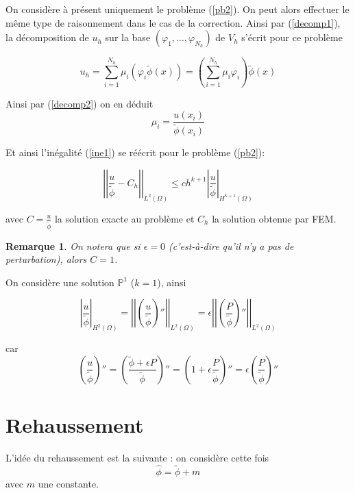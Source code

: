 \documentclass[french]{article}
\newtheorem*{Rem}{Remarque}
\begin{document}
	On considère à présent uniquement le problème (\ref{pb2}). On peut alors effectuer le même type de raisonnement dans le cas de la correction. Ainsi par (\ref{decomp1}), la décomposition de $u_h$ sur la base $(\varphi_1,\dots,\varphi_{N_h})$ de $V_h$ s'écrit pour ce problème
	
	\begin{equation}
		u_h=\sum_{i=1}^{N_h}\mu_i(\varphi_i\tilde{\phi}(x))=\left(\sum_{i=1}^{N_h}\mu_i\varphi_i\right)\tilde{\phi}(x) \label{decomp2}
	\end{equation}
		
	Ainsi par (\ref{decomp2}) on en déduit
	$$\mu_i=\frac{u(x_i)}{\tilde{\phi}(x_i)}$$

	Et ainsi l'inégalité (\ref{ine1}) se réécrit pour le problème (\ref{pb2}):
	
	\begin{equation}
		\left|\left|\frac{u}{\tilde{\phi}}-C_h\right|\right|_{L^2(\Omega)}\le ch^{k+1}\left|\frac{u}{\tilde{\phi}}\right|_{H^{k+1}(\Omega)} \label{ine2}
	\end{equation}

	avec $C=\frac{u}{\tilde{\phi}}$ la solution exacte au problème et $C_h$ la solution obtenue par FEM.
	
	\begin{Rem}
		On notera que si $\epsilon=0$ (c'est-à-dire qu'il n'y a pas de perturbation), alors $C=1$.
	\end{Rem}
	
	On considère une solution $\mathbb{P}^1$ ($k=1$), ainsi
	
	\begin{equation}
		\left|\frac{u}{\tilde{\phi}}\right|_{H^2(\Omega)}=\left|\left|\left(\frac{u}{\tilde{\phi}}\right)''\right|\right|_{L^2(\Omega)}=\epsilon\left|\left|\left(\frac{P}{\tilde{\phi}}\right)''\right|\right|_{L^2(\Omega)} \label{der1}
	\end{equation}
	
	car
	$$\left(\frac{u}{\tilde{\phi}}\right)''=\left(\frac{\tilde{\phi}+\epsilon P}{\tilde{\phi}}\right)''=\left(1+\epsilon\frac{P}{\tilde{\phi}}\right)''=\epsilon\left(\frac{P}{\tilde{\phi}}\right)''$$

	\section*{Rehaussement}
	
	L'idée du rehaussement est la suivante : on considère cette fois
	$$\hat{\phi}=\tilde{\phi}+m$$
	avec $m$ une constante.
	
\end{document}
